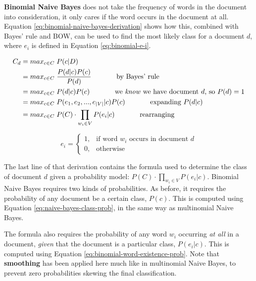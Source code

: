 \documentclass{article}
\begin{document}
\textbf{Binomial Naive Bayes} does not take the frequency of words in the document into consideration, it only cares if the word occurs in the document at all. Equation \ref{eq:binomial-naive-bayes-derivation} shows how this, combined with Bayes' rule and BOW, can be used to find the most likely class for a document $d$, where $e_i$ is defined in Equation \ref{eq:binomial-e-i}.

\begin{equation}
\begin{aligned}[b]
	C_{d} &= max_{c \in C} \; P(c|D) \\
	&= max_{c \in C} \; \frac{P(d|c)P(c)}{P(d)} 
	\;\;\;\;\;\;\;\;\;\;\;\;\; \text{by Bayes' rule} \\
	&= max_{c \in C} \; P(d|c)P(c) 
	\;\;\;\;\;\;\;\;\;\;\;\;\; \text{we \textit{know} we have document }d\text{, so } P(d) = 1 \\
	&= max_{c \in C} \; P(e_1,e_2,...,e_{|V|}| c)P(c)
	\;\;\;\;\;\;\;\;\;\;\;\;\; \text{expanding }P(d|c) \\	
	&= max_{c \in C} \; P(C) \cdot \prod_{w_i \in V} {P(e_i|c)}
	\;\;\;\;\;\;\;\;\;\;\;\;\; \text{rearranging} \\
\end{aligned}
\label{eq:biomial-naive-bayes-derivation}
\end{equation}

\begin{equation}
	e_i = \begin{cases}
		1,& \text{if word }w_i\text{ occurs in document }d \\
		0,& \text{otherwise}
	\end{cases}
	\label{eq:binomial-e-i}
\end{equation}

The last line of that derivation contains the formula used to determine the class of document $d$ given a probability model:  $P(C) \cdot \prod_{w_i \in V} {P(e_i|c)}$. Binomial Naive Bayes requires two kinds of probabilities. As before, it requires the probability of any document be a certain class, $P(c)$. This is computed using Equation \ref{eq:naive-bayes-class-prob}, in the same way as multinomial Naive Bayes.

The formula also requires the probability of any word $w_i$ occurring \textit{at all} in a document, \textit{given} that the document is a particular class, $P(e_i|c)$. This is computed using Equation \ref{eq:binomial-word-existence-prob}. Note that \textbf{smoothing} has been applied here much like in multinomial Naive Bayes, to prevent zero probabilities skewing the final classification.
\end{document}
